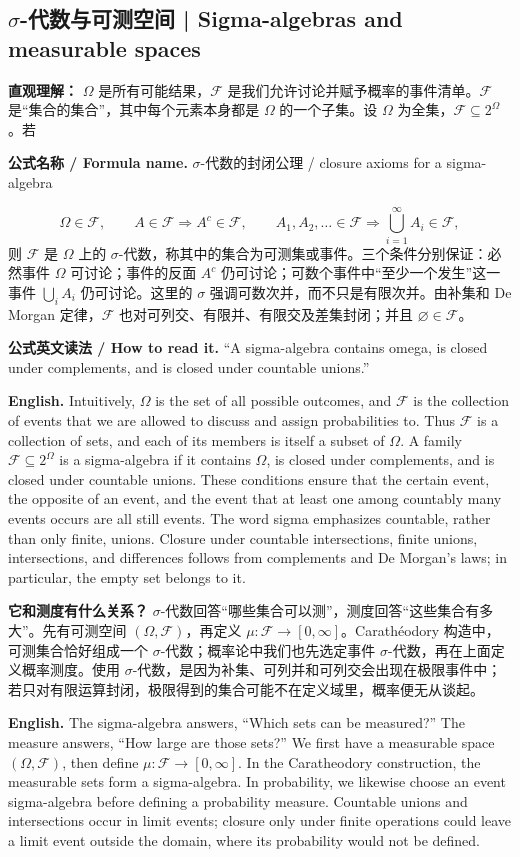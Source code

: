 \documentclass[UTF8,11pt,a4paper]{ctexart}
\newcommand{\EN}[1]{\par\noindent\textbf{English.} #1\par}
\newcommand{\READ}[1]{\par\noindent\textbf{公式英文读法 / How to read it.} #1\par}
\newcommand{\FORMULA}[2]{\par\noindent\textbf{公式名称 / Formula name.} #1 / #2\par}
\begin{document}
\subsection{\texorpdfstring{$\sigma$}{sigma}-代数与可测空间 | Sigma-algebras and measurable spaces}
\noindent\textbf{直观理解：} $\Omega$ 是所有可能结果，$\mathcal F$ 是我们允许讨论并赋予概率的事件清单。$\mathcal F$ 是“集合的集合”，其中每个元素本身都是 $\Omega$ 的一个子集。设 $\Omega$ 为全集，$\mathcal F\subseteq2^\Omega$。若
\FORMULA{$\sigma$-代数的封闭公理}{closure axioms for a sigma-algebra}
\[
\Omega\in\mathcal F,\qquad
A\in\mathcal F\Rightarrow A^c\in\mathcal F,\qquad
A_1,A_2,\ldots\in\mathcal F\Rightarrow\bigcup_{i=1}^{\infty}A_i\in\mathcal F,
\]
则 $\mathcal F$ 是 $\Omega$ 上的 $\sigma$-代数，称其中的集合为可测集或事件。三个条件分别保证：必然事件 $\Omega$ 可讨论；事件的反面 $A^c$ 仍可讨论；可数个事件中“至少一个发生”这一事件 $\bigcup_iA_i$ 仍可讨论。这里的 $\sigma$ 强调可数次并，而不只是有限次并。由补集和 De Morgan 定律，$\mathcal F$ 也对可列交、有限并、有限交及差集封闭；并且 $\varnothing\in\mathcal F$。
\READ{“A sigma-algebra contains omega, is closed under complements, and is closed under countable unions.”}
\EN{Intuitively, $\Omega$ is the set of all possible outcomes, and $\mathcal F$ is the collection of events that we are allowed to discuss and assign probabilities to. Thus $\mathcal F$ is a collection of sets, and each of its members is itself a subset of $\Omega$. A family $\mathcal F\subseteq2^\Omega$ is a sigma-algebra if it contains $\Omega$, is closed under complements, and is closed under countable unions. These conditions ensure that the certain event, the opposite of an event, and the event that at least one among countably many events occurs are all still events. The word sigma emphasizes countable, rather than only finite, unions. Closure under countable intersections, finite unions, intersections, and differences follows from complements and De Morgan's laws; in particular, the empty set belongs to it.}

\noindent\textbf{它和测度有什么关系？} $\sigma$-代数回答“哪些集合可以测”，测度回答“这些集合有多大”。先有可测空间 $(\Omega,\mathcal F)$，再定义 $\mu:\mathcal F\to[0,\infty]$。Carath\'eodory 构造中，可测集合恰好组成一个 $\sigma$-代数；概率论中我们也先选定事件 $\sigma$-代数，再在上面定义概率测度。使用 $\sigma$-代数，是因为补集、可列并和可列交会出现在极限事件中；若只对有限运算封闭，极限得到的集合可能不在定义域里，概率便无从谈起。
\EN{The sigma-algebra answers, “Which sets can be measured?” The measure answers, “How large are those sets?” We first have a measurable space $(\Omega,\mathcal F)$, then define $\mu:\mathcal F\to[0,\infty]$. In the Caratheodory construction, the measurable sets form a sigma-algebra. In probability, we likewise choose an event sigma-algebra before defining a probability measure. Countable unions and intersections occur in limit events; closure only under finite operations could leave a limit event outside the domain, where its probability would not be defined.}
\end{document}
